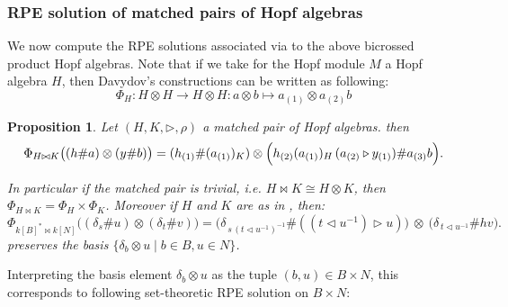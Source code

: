 \documentclass[a4paper,10pt]{amsart}
\newtheorem{proposition}[lemma]{Proposition}
\theoremstyle{definition}
\theoremstyle{remark}
\newcommand\triangler{\triangleright}
\newcommand\ot{\otimes}
\begin{document}
\subsubsection{RPE solution of matched pairs of Hopf algebras}

We now compute the RPE solutions associated via  to the above bicrossed product Hopf algebras. Note that if we take for the Hopf module $M$ a Hopf algebra $H$, then Davydov's constructions can be written as following:
\begin{equation}\label{concrete for Davydov}
    \Phi_H: H \ot H \rightarrow H \ot H : a\otimes b \mapsto a_{(1)}\otimes a_{(2)}b
\end{equation}

\begin{proposition} \label{solutions of hopf mashed pair} 
Let $(H,K, \triangler,\rho)$ a matched pair of Hopf algebras. then 
$$
\Phi_{H\bowtie K}\bigl((h\# a)\otimes (y\# b)\bigr)
=
(h_{(1)}\# (a_{(1)})_K)\otimes
\Bigl(
h_{(2)}(a_{(1)})_H\,(a_{(2)}\triangler y_{(1)})\# a_{(3)}b
\Bigr).
$$

In particular if the matched pair is trivial, i.e. $H \bowtie K \cong H \ot K$, then $\Phi_{H \bowtie K} = \Phi_{H} \times \Phi_{K}$. Moreover if $H$ and $K$ are as in , then:
$$
\Phi_{k[B]^* \bowtie k[N]}\bigl((\delta_s\# u)\otimes(\delta_t\# v)\bigr)
=
\bigl(\delta_{\,s\,(t\triangleleft u^{-1})^{-1}}\# ((t\triangleleft u^{-1})\triangleright u)\bigr)
\ \otimes\
\bigl(\delta_{\,t\triangleleft u^{-1}}\# hv\bigr).
$$
preserves the basis $\{ \delta_b \ot u \mid b \in B, u \in N \}$.
\end{proposition}

Interpreting the basis element $\delta_b\otimes u$ as the tuple $(b,u)\in B\times N$,
this corresponds to following set-theoretic RPE solution on $B \times N$: 
\end{document}
